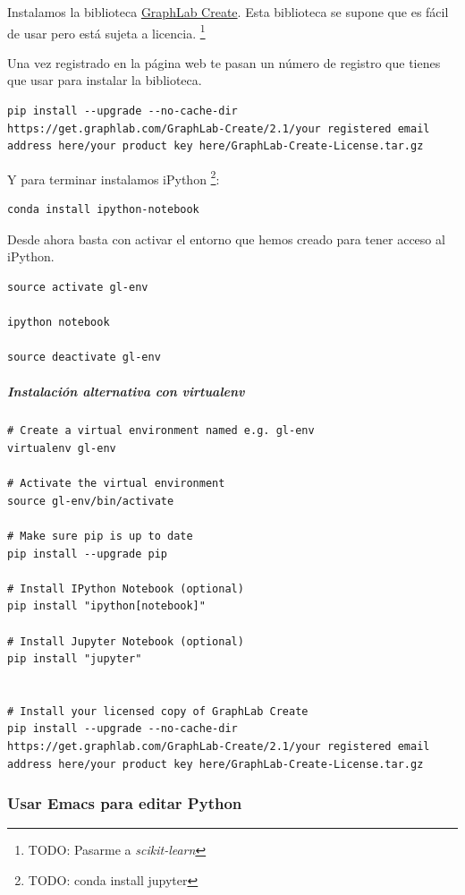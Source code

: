 \documentclass[12pt,spanish,]{scrartcl}
\let\oldsubparagraph\subparagraph
\renewcommand{\subparagraph}[1]{\oldsubparagraph{#1}\mbox{}}
\begin{document}
Instalamos la biblioteca
\href{https://turi.com/products/create/}{GraphLab Create}. Esta
biblioteca se supone que es fácil de usar pero está sujeta a licencia.
\footnote{TODO: Pasarme a \emph{scikit-learn}}

Una vez registrado en la página web te pasan un número de registro que
tienes que usar para instalar la biblioteca.

\begin{verbatim}
pip install --upgrade --no-cache-dir https://get.graphlab.com/GraphLab-Create/2.1/your registered email address here/your product key here/GraphLab-Create-License.tar.gz
\end{verbatim}

Y para terminar instalamos iPython \footnote{TODO: conda install jupyter}:

\begin{verbatim}
conda install ipython-notebook
\end{verbatim}

Desde ahora basta con activar el entorno que hemos creado para tener
acceso al iPython.

\begin{verbatim}
source activate gl-env

ipython notebook

source deactivate gl-env
\end{verbatim}

\subparagraph{Instalación alternativa con
virtualenv}\label{instalaciuxf3n-alternativa-con-virtualenv}

\begin{verbatim}
# Create a virtual environment named e.g. gl-env
virtualenv gl-env

# Activate the virtual environment
source gl-env/bin/activate

# Make sure pip is up to date
pip install --upgrade pip

# Install IPython Notebook (optional)
pip install "ipython[notebook]"

# Install Jupyter Notebook (optional)
pip install "jupyter"


# Install your licensed copy of GraphLab Create
pip install --upgrade --no-cache-dir https://get.graphlab.com/GraphLab-Create/2.1/your registered email address here/your product key here/GraphLab-Create-License.tar.gz
\end{verbatim}

\subsubsection{Usar Emacs para editar
Python}\label{usar-emacs-para-editar-python}
\end{document}
